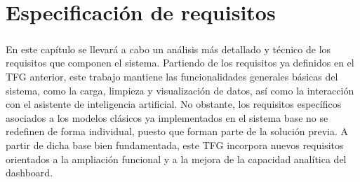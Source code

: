 \chapter{Especificación de requisitos}
\label{ch:especificación de requisitos}

\paragraph*{}En este capítulo se llevará a cabo un análisis más detallado y técnico de los requisitos que componen el sistema.
Partiendo de los requisitos ya definidos en el TFG anterior, este trabajo mantiene las funcionalidades generales básicas del sistema, como la carga, limpieza y visualización de datos, así como la interacción con el asistente de inteligencia artificial. No obstante, los requisitos específicos asociados a los modelos clásicos ya implementados en el sistema base no se redefinen de forma individual, puesto que forman parte de la solución previa. A partir de dicha base bien fundamentada, este TFG incorpora nuevos requisitos orientados a la ampliación funcional y a la mejora de la capacidad analítica del dashboard.
